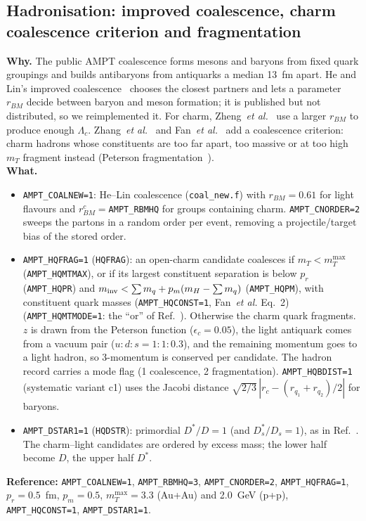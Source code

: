 \documentclass[11pt,a4paper]{article}
\newcommand{\sw}[1]{\texttt{#1}}
\newcommand{\code}[1]{\texttt{#1}}
\begin{document}
\subsection{Hadronisation: improved coalescence, charm coalescence criterion and fragmentation}
\textbf{Why.} The public AMPT coalescence forms mesons and baryons from fixed quark groupings and builds antibaryons from
antiquarks a median 13~fm apart. He and Lin's improved coalescence~\cite{helin2017} chooses the closest partners and
lets a parameter $r_{BM}$ decide between baryon and meson formation; it is published but not distributed, so we
reimplemented it. For charm, Zheng~\emph{et al.}~\cite{zheng2020} use a larger $r_{BM}$ to produce enough $\Lambda_c$.
Zhang~\emph{et al.}~\cite{zhang2024} and Fan~\emph{et al.}~\cite{fan2026} add a coalescence criterion: charm hadrons
whose constituents are too far apart, too massive or at too high $m_T$ fragment instead (Peterson
fragmentation~\cite{peterson}).\\
\textbf{What.}
\begin{itemize}
\item \sw{AMPT\_COALNEW=1}: He--Lin coalescence (\code{coal\_new.f}) with $r_{BM}=0.61$ for light flavours and
  $r_{BM}^c=$\sw{AMPT\_RBMHQ} for groups containing charm. \sw{AMPT\_CNORDER=2} sweeps the partons in a random order
  per event, removing a projectile/target bias of the stored order.
\item \sw{AMPT\_HQFRAG=1} (\code{HQFRAG}): an open-charm candidate coalesces if $m_T<m_T^{\max}$ (\sw{AMPT\_HQMTMAX}),
  or if its largest constituent separation is below $p_r$ (\sw{AMPT\_HQPR}) and $m_{\rm inv}<\sum m_q+p_m(m_H-\sum m_q)$
  (\sw{AMPT\_HQPM}), with constituent quark masses (\sw{AMPT\_HQCONST=1}, Fan~\emph{et al.} Eq.~2) (\sw{AMPT\_HQMTMODE=1}:
  the ``or'' of Ref.~\cite{fan2026}). Otherwise the charm quark fragments. $z$ is drawn from the Peterson function
  ($\epsilon_c=0.05$), the light antiquark comes from a vacuum pair ($u:d:s=1:1:0.3$), and the remaining momentum goes
  to a light hadron, so 3-momentum is conserved per candidate. The hadron record carries a mode flag
  (1 coalescence, 2 fragmentation). \sw{AMPT\_HQBDIST=1} (systematic variant c1) uses the Jacobi distance
  $\sqrt{2/3}\,|r_c-(r_{q_1}+r_{q_2})/2|$ for baryons.
\item \sw{AMPT\_DSTAR1=1} (\code{HQDSTR}): primordial $D^*/D=1$ (and $D_s^*/D_s=1$), as in Ref.~\cite{zheng2020}. The
  charm--light candidates are ordered by excess mass; the lower half become $D$, the upper half $D^*$.
\end{itemize}
\textbf{Reference:} \sw{AMPT\_COALNEW=1}, \sw{AMPT\_RBMHQ=3}, \sw{AMPT\_CNORDER=2}, \sw{AMPT\_HQFRAG=1}, $p_r=0.5$~fm,
$p_m=0.5$, $m_T^{\max}=3.3$ (Au+Au) and 2.0~GeV (p+p), \sw{AMPT\_HQCONST=1}, \sw{AMPT\_DSTAR1=1}.
\end{document}
